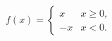 \documentclass{article}
\begin{document}
\[
f(x)=\begin{cases}
x & x\geq 0,\\
-x & x<0.
\end{cases}
\]
\end{document}
